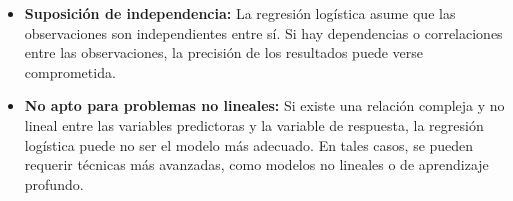 \begin{itemize}
\begin{itemize}
\begin{itemize}
                \item \textbf{Suposición de independencia:} La regresión logística asume que las observaciones son independientes entre sí. Si hay dependencias o correlaciones entre las observaciones, la precisión de los resultados puede verse comprometida.
                \item \textbf{No apto para problemas no lineales:} Si existe una relación compleja y no lineal entre las variables predictoras y la variable de respuesta, la regresión logística puede no ser el modelo más adecuado. En tales casos, se pueden requerir técnicas más avanzadas, como modelos no lineales o de aprendizaje profundo.
            \end{itemize}
    \end{itemize}

\end{itemize}
